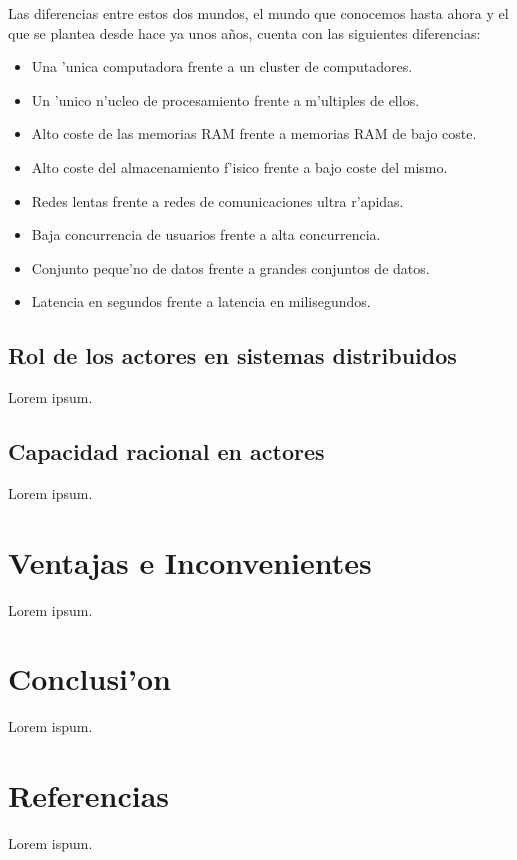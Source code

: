 \documentclass[12pt]{article}
\begin{document}
Las diferencias entre estos dos mundos, el mundo que conocemos hasta ahora y el que se plantea
desde hace ya unos años, cuenta con las siguientes diferencias:

\begin{itemize}
	\item Una 'unica computadora frente a un cluster de computadores.
	\item Un 'unico n'ucleo de procesamiento frente a m'ultiples de ellos.
	\item Alto coste de las memorias RAM frente a memorias RAM de bajo coste.
	\item Alto coste del almacenamiento f'isico frente a bajo coste del mismo.
    \item Redes lentas frente a redes de comunicaciones ultra r'apidas.
    \item Baja concurrencia de usuarios frente a alta concurrencia.
    \item Conjunto peque'no de datos frente a grandes conjuntos de datos.
    \item Latencia en segundos frente a latencia en milisegundos.
\end{itemize}

\subsection{Rol de los actores en sistemas distribuidos}
\label{sub:rol de los actores en sistemas distribuidos}
Lorem ipsum.
\subsection{Capacidad racional en actores}
\label{sub:capacidad racional en actores}
Lorem ipsum.
\section{Ventajas e Inconvenientes}
\label{sec:ventajas e inconvenientes}
Lorem ipsum.
\section{Conclusi'on}
Lorem ispum.
\section{Referencias}
Lorem ispum.
\end{document}
